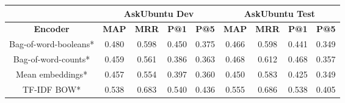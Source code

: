 \documentclass[12pt]{article}
\begin{document}
\begin{center}
		\begin{tabular}{|c||c|c|c|c||c|c|c|c|}
			\hline
			\cellcolor{gray!15}
				& \multicolumn{4}{c||}{\cellcolor{gray!15}AskUbuntu Dev}
				& \multicolumn{4}{c|}{\cellcolor{gray!15}AskUbuntu Test} \\ \hline
			\cellcolor{gray!15}\textbf{Encoder}
				& \cellcolor{gray!15}\textbf{MAP} & \cellcolor{gray!15}\textbf{MRR}
				& \cellcolor{gray!15}\textbf{P@1} & \cellcolor{gray!15}\textbf{P@5}
				& \cellcolor{gray!15}\textbf{MAP} & \cellcolor{gray!15}\textbf{MRR}
				& \cellcolor{gray!15}\textbf{P@1} & \cellcolor{gray!15}\textbf{P@5} \\ \hline\hline
			\cellcolor{red!15}Bag-of-word-booleans* & 0.480 & 0.598 & 0.450 & 0.375 & 0.466 & 0.598 & 0.441 & 0.349 \\ \hline
			\cellcolor{red!15}Bag-of-word-counts* & 0.459 & 0.561 & 0.386 & 0.363 & 0.468 & 0.612 & 0.468 & 0.357 \\ \hline
			\cellcolor{red!15}Mean embeddings* & 0.457 & 0.554 & 0.397 & 0.360 & 0.450 & 0.583 & 0.425 & 0.349 \\ \hline
			\cellcolor{red!15}TF-IDF BOW* & 0.538 & 0.683 & 0.540 & 0.436 & 0.555 & 0.686 & 0.538 & 0.405 \\ \hline\hline

\end{tabular}
\end{center}
\end{document}
